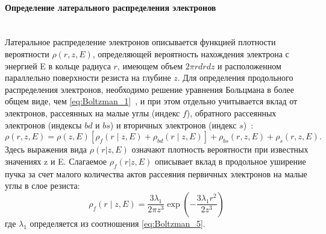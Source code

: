 \paragraph{Определение латерального распределения электронов} \mbox{} \\
\indent Латеральное распределение электронов описывается функцией плотности вероятности $\rho(r, z, E)$, определяющей вероятность нахождения электрона с энергией E в кольце радиуса $r$, имеющем объем $2 \pi r dr dz$ и расположенном параллельно поверхности резиста на глубине $z$. Для определения продольного распределения электронов, необходимо решение уравнения Больцмана в более общем виде, чем \ref{eq:Boltzman_1}~\cite{ME_rev_63}, и при этом отдельно учитывается вклад от электронов, рассеянных на малые углы (индекс $f$), обратного рассеянных электронов (индексы $bd$ и $bs$) и вторичных электронов (индекс $s$)~\cite{ME_rev_64}:
\begin{equation} \label{eq:Boltzman_10}
	\rho(r, z, E)=\rho(z, E)\left[\rho_f(r \mid z, E)+\rho_{b d}(r \mid z, E)\right]+\rho_{b s}(r, z, E)+\rho_s(r, z, E).
\end{equation}
Здесь выражения вида $\rho(r|z,E)$ означают плотность вероятности при известных значениях z и E. Слагаемое $\rho_f(r|z,E)$ описывает вклад в продольное уширение пучка за счет малого количества актов рассеяния первичных электронов на малые углы в слое резиста:
\begin{equation} \label{eq:Boltzman_11}
	\rho_f(r \mid z, E)=\frac{3 \lambda_1}{2 \pi z^3} \exp \left(-\frac{3 \lambda_1 r^2}{2 z^3}\right)
\end{equation}
где $\lambda_1$ определяется из соотношения \ref{eq:Boltzman_5}.

